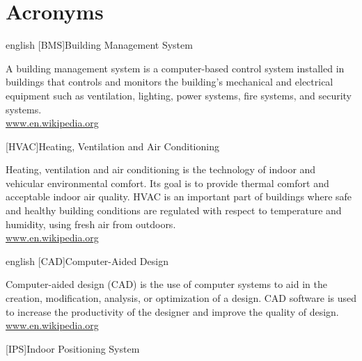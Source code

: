%
%
\cleardoublepage
%
\chapter{Acronyms}
%
%
\begin{acronym}[OpenFOAM]	%
%
%
%
%
\begin{otherlanguage*}{english}
%
[BMS]{Building Management System}

{\smaller A building management system is a computer-based control system installed in buildings that controls and monitors the building’s mechanical and electrical equipment such as ventilation, lighting, power systems, fire systems, and security systems.\\
\href{https://en.wikipedia.org/wiki/Building_management_system}{www.en.wikipedia.org}
\par}
%
\end{otherlanguage*}
%
%
[HVAC]{Heating, Ventilation and Air Conditioning}

{\smaller Heating, ventilation and air conditioning is the technology of indoor and vehicular environmental comfort. Its goal is to provide thermal comfort and acceptable indoor air quality. HVAC is an important part of buildings where safe and healthy building conditions are regulated with respect to temperature and humidity, using fresh air from outdoors.\\
\href{https://en.wikipedia.org/wiki/HVAC}{www.en.wikipedia.org}
\par}
%
%
\begin{otherlanguage*}{english}
%
[CAD]{Computer-Aided Design}

{\smaller Computer-aided design (CAD) is the use of computer systems to aid in the creation, modification, analysis, or optimization of a design. CAD software is used to increase the productivity of the designer and improve the quality of design.\\
\href{https://en.wikipedia.org/wiki/Computer-aided_design}{www.en.wikipedia.org}
\par}
%
\end{otherlanguage*}
%
%
[IPS]{Indoor Positioning System}


\end{acronym}
